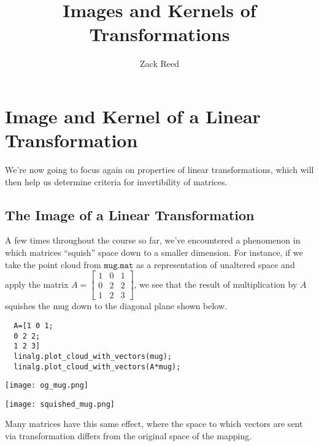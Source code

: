 \documentclass{ximera}
\author{Zack Reed}
\title{Images and Kernels of Transformations}
\begin{document}
\begin{abstract}

\end{abstract}
\maketitle


\section*{Image and Kernel of a Linear Transformation}

We're now going to focus again on properties of linear transformations, which will then help us determine criteria for invertibility of matrices.

\subsection*{The Image of a Linear Transformation}

A few times throughout the course so far, we've encountered a phenomenon in which matrices ``squish'' space down to a smaller dimension. For instance, if we take the point cloud from $\texttt{mug.mat}$ as a representation of unaltered space and apply the matrix $A=\begin{bmatrix}
  1&0&1\\0&2&2\\1&2&3
\end{bmatrix}$, we see that the result of multiplication by $A$ squishes the mug down to the diagonal plane shown below. 

\begin{verbatim}
  A=[1 0 1;
  0 2 2;
  1 2 3]
  linalg.plot_cloud_with_vectors(mug);
  linalg.plot_cloud_with_vectors(A*mug);
\end{verbatim}



\begin{center}
  \texttt{[image: og\_mug.png]}
\end{center}

\begin{center}
  \texttt{[image: squished\_mug.png]}
\end{center}

Many matrices have this same effect, where the space to which vectors are sent via transformation differs from the original space of the mapping. 
\end{document}
